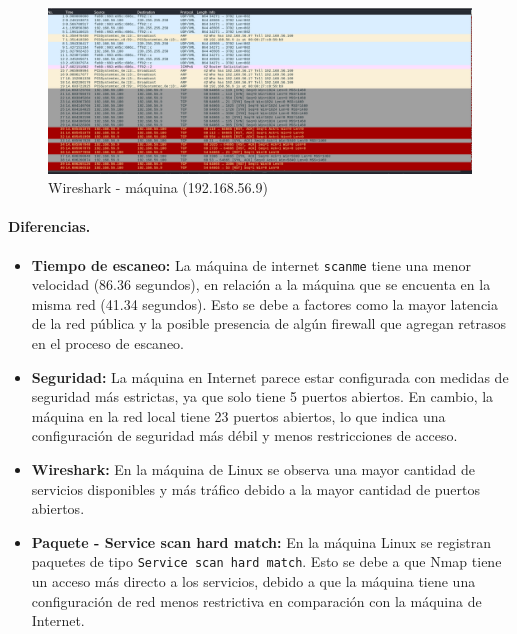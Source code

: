 \documentclass[a4paper,12pt]{article} %
\begin{document}
        \begin{figure} [hp!]
         \centering
         \includegraphics[width=1\textwidth]{Imagenes/wireRed.png}
         \caption{Wireshark - máquina (192.168.56.9) }
         \label{fig:wireshark2}
        \end{figure}

   
    \paragraph{Diferencias.}
    \begin{itemize}
        \item \textbf{Tiempo de escaneo: }La máquina de internet \texttt{scanme} tiene una menor velocidad (86.36 segundos), en relación a la máquina que se encuenta en la misma red (41.34 segundos). Esto se debe a factores como la mayor latencia de la red pública y la posible presencia de algún firewall que agregan retrasos en el proceso de escaneo.

        \item \textbf{Seguridad: } La máquina en Internet parece estar configurada con medidas de seguridad más estrictas, ya que solo tiene 5 puertos abiertos. En cambio, la máquina en la red local tiene 23 puertos abiertos, lo que indica una configuración de seguridad más débil y menos restricciones de acceso.

        \item \textbf{Wireshark: }En la máquina de Linux se observa una mayor cantidad de servicios disponibles y más tráfico debido a la mayor cantidad de puertos abiertos.

        \item \textbf{Paquete - Service scan hard match:} En la máquina Linux se registran paquetes de tipo \texttt{Service scan hard match}. Esto se debe a que Nmap tiene un acceso más directo a los servicios, debido a que la máquina tiene una configuración de red menos restrictiva en comparación con la máquina de Internet.
        
    \end{itemize}
\end{document}
